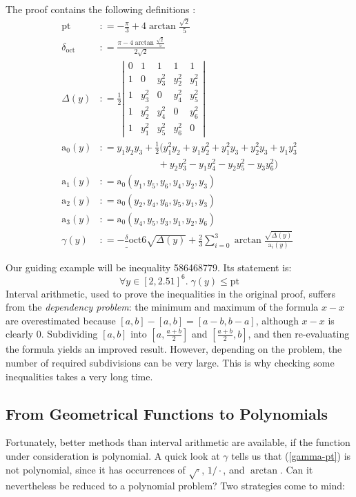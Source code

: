 \documentclass[11pt]{amsart}
\def\coloneq{\mathrel{\mathop:}=}
\def\sfrac#1#2{{\textstyle \frac {#1} {#2}}}
\def\eqref#1{(\ref{#1})}
\def\pt{\mathrm{pt}}
\def\doct{\delta_{\mathrm{oct}}}
\def\asolid{\mathrm{a}}
\begin{document}
The proof contains the following definitions \cite{sp1}:
\begin{align*}
  \pt &\coloneq - \frac \pi 3 + 4 \arctan \frac{\sqrt 2}5 \\
\doct &\coloneq \frac {\pi - 4 \arctan \frac{\sqrt 2}5}{2 \sqrt 2}\\
\Delta(y) &\coloneq \frac 1 2
  \left|
  \begin{array}{ccccc}
0 & 1 & 1 & 1 & 1 \\
   1 & 0 & y_3^2 & y_2^2 & y_1^2 \\
   1 & y_3^2 & 0 & y_4^2 & y_5^2 \\
   1 & y_2^2 & y_4^2 & 0 & y_6^2 \\
   1 & y_1^2 & y_5^2 & y_6^2 & 0
  \end{array}
  \right|\\
\asolid_0(y) &\coloneq y_1 y_2 y_3 + \sfrac 1 2 (
y_1^2 y_2 + y_1 y_2^2 + y_1^2 y_3 + y_2^2 y_3 + y_1 y_3^2 \\
&\qquad\qquad\qquad {} + y_2 y_3^2 - y_1 y_4^2 - y_2 y_5^2 - y_3 y_6^2)\\
\asolid_1(y) &\coloneq \asolid_0 (y_1, y_5, y_6, y_4, y_2, y_3)\\
\asolid_2(y) &\coloneq \asolid_0 (y_2, y_4, y_6, y_5, y_1, y_3)\\
\asolid_3(y) &\coloneq \asolid_0 (y_4, y_5, y_3, y_1, y_2, y_6)\\
\gamma(y) &\coloneq 
- \frac \doct 6 \sqrt {\Delta(y)} + \frac 2 3 \sum_{i=0}^3 \arctan \frac
{\sqrt{\Delta(y)}} {\asolid_i(y)}
\end{align*}

Our guiding example will be inequality 586468779. Its statement is:
\begin{equation}
\forall y \in [2,2.51]^6.\; \gamma(y) \le \pt \label{gamma-pt}
\end{equation}
Interval arithmetic, used to prove the inequalities in the original proof,
suffers from the \emph{dependency problem}: the minimum and maximum of the
formula $x-x$ are overestimated because $[a,b] - [a,b] = [a-b,b-a]$, although
$x-x$ is clearly $0$. Subdividing $[a,b]$ into $[a,\sfrac{a+b}2]$ and
$[\sfrac{a+b}2,b]$, and then re-evaluating the formula yields an improved
result. However, depending on the problem, the number of required subdivisions
can be very large. This is why checking some inequalities takes a very long
time.

\subsection*{From Geometrical Functions to Polynomials}
Fortunately, better methods than interval arithmetic are available, if the
function under consideration is polynomial. A quick look at $\gamma$ tells us
that \eqref{gamma-pt} is not polynomial, since it has occurrences of
$\sqrt\cdot$, $1/\cdot$, and $\arctan$. Can it nevertheless be reduced
to a polynomial problem? Two strategies come to mind:
\end{document}
